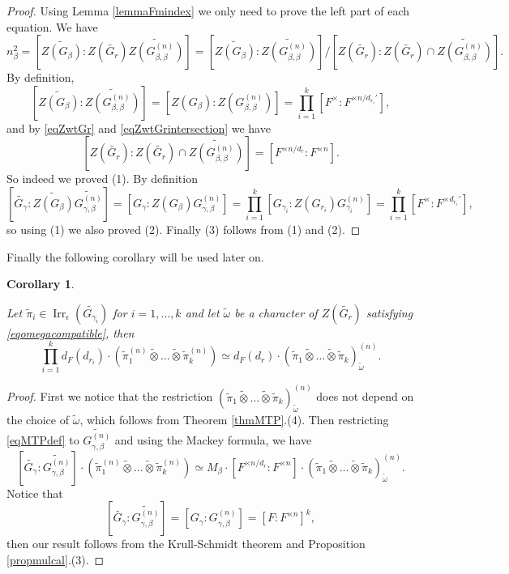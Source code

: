 \documentclass{amsart}
\numberwithin{equation}{section}
\newtheorem{corollary}[theorem]{\bf{Corollary}}
\newcommand{\mrirr}{\operatorname{Irr}}
\newcommand{\dF}[1]{d_{F}(#1)}
\newcommand{\wt}[1]{\widetilde{#1}}
\begin{document}
	\begin{proof}
		
		Using Lemma \ref{lemmaFmindex} we only need to prove the left part of each equation. We have
		$$n_{\beta}^{2}=[\wt{Z(G_{\beta})}:Z(\wt{G_{r}})\wt{Z(G_{\beta,\beta}^{(n)})}]=[\wt{Z(G_{\beta})}:\wt{Z(G_{\beta,\beta}^{(n)})}]/[Z(\wt{G_{r}}):Z(\wt{G_{r}})\cap \wt{Z(G_{\beta,\beta}^{(n)})}].$$
		By definition,
		$$[\wt{Z(G_{\beta})}:\wt{Z(G_{\beta,\beta}^{(n)})}]=[Z(G_{\beta}):Z(G_{\beta,\beta}^{(n)})]=\prod_{i=1}^{k}[F^{\times}:F^{\times n/d_{r_{i}}'}],$$
		and by \eqref{eqZwtGr} and \eqref{eqZwtGrintersection} we have
		$$[Z(\wt{G_{r}}):Z(\wt{G_{r}})\cap \wt{Z(G_{\beta,\beta}^{(n)})}]=[F^{\times n/d_{r}}:F^{\times n}].$$
		So indeed we proved (1). By definition 
		$$[\wt{G_{\gamma}}:\wt{Z(G_{\beta})}\wt{G_{\gamma,\beta}^{(n)}}]=[G_{\gamma}:Z(G_{\beta})G_{\gamma,\beta}^{(n)}]=\prod_{i=1}^{k}[G_{\gamma_{i}}:Z(G_{r_{i}})G_{\gamma_{i}}^{(n)}]=\prod_{i=1}^{k}[F^{\times}:F^{\times d_{r_{i}}'}],$$
		so using (1) we also proved (2). Finally (3) follows from (1) and (2).
		
	\end{proof}
	
	Finally the following corollary will be used later on.
	
	\begin{corollary}\label{corpirest}
		
		Let $\wt{\pi}_{i}\in\mrirr_{\epsilon}(\wt{G_{\gamma_{i}}})$ for $i=1,\dots,k$ and let $\wt{\omega}$ be a character of $Z(\wt{G_{r}})$ satisfying \eqref{eqomegacompatible}, then
		$$\prod_{i=1}^{k}\dF{d_{r_{i}}}\cdot(\wt{\pi}_{1}^{(n)}\wt{\otimes}\dots\wt{\otimes}\wt{\pi}_{k}^{(n)})\simeq \dF{d_{r}}\cdot(\wt{\pi}_{1}\wt{\otimes}\dots\wt{\otimes}\wt{\pi}_{k})_{\wt{\omega}}^{(n)}.$$
		
	\end{corollary}
	
	\begin{proof}
		
		First we notice that the restriction $(\wt{\pi}_{1}\wt{\otimes}\dots\wt{\otimes}\wt{\pi}_{k})_{\wt{\omega}}^{(n)}$ does not depend on the choice of $\wt{\omega}$, which follows from Theorem \ref{thmMTP}.(4). Then restricting \eqref{eqMTPdef} to $\wt{G_{\gamma,\beta}^{(n)}}$ and using the Mackey formula, we have 
		$$[\wt{G_{\gamma}}:\wt{G_{\gamma,\beta}^{(n)}}]\cdot(\wt{\pi}_{1}^{(n)}\wt{\otimes}\dots\wt{\otimes}\wt{\pi}_{k}^{(n)}) \simeq M_{\beta}\cdot[F^{\times n/d_{r}}:F^{\times n}]\cdot (\wt{\pi}_{1}\wt{\otimes}\dots\wt{\otimes}\wt{\pi}_{k})_{\wt{\omega}}^{(n)}.$$
		Notice that 
		$$[\wt{G_{\gamma}}:\wt{G_{\gamma,\beta}^{(n)}}]=[G_{\gamma}:G_{\gamma,\beta}^{(n)}]=[F:F^{\times n}]^{k},$$
		then our result follows from the Krull-Schmidt theorem and Proposition \ref{propmulcal}.(3).
		
	\end{proof}
	
\end{document}
